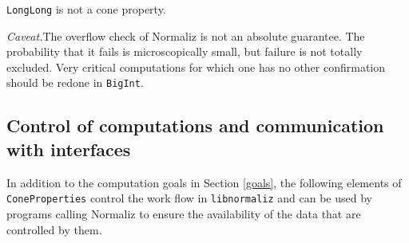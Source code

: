 \documentclass[12pt,a4paper]{scrartcl}
\theoremstyle{definition}
\begin{document}
\verb|LongLong| is  not a cone property.

\emph{Caveat.}\enspace The overflow check of Normaliz is not an absolute guarantee. The probability that it fails is microscopically small, but failure is not totally excluded. Very critical computations for which one has no other confirmation should be redone in \verb|BigInt|.

\subsection{Control of computations and communication with interfaces}

In addition to the computation goals in Section \ref{goals}, 
the following elements of \verb|ConeProperties| control the work flow in \verb|libnormaliz| and can be used by programs calling Normaliz to ensure the availability of the data that are controlled by them.
\end{document}
